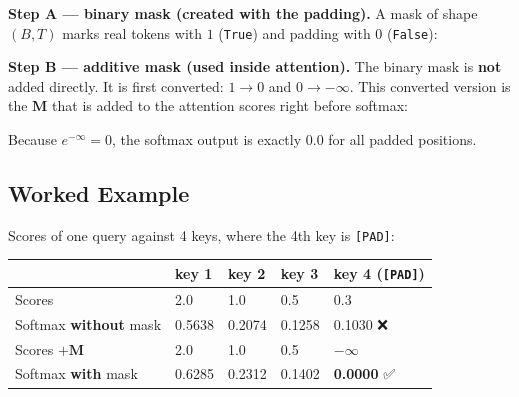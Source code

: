 \documentclass[11pt,a4paper,oneside]{report}
\begin{document}
\textbf{Step A --- binary mask (created with the padding).} A mask of shape \((B, T)\) marks real tokens with \(1\) (\texttt{True}) and padding with \(0\) (\texttt{False}):

\begin{center}\end{center}

\textbf{Step B --- additive mask (used inside attention).} The binary mask is \textbf{not} added directly. It is first converted: \(1 \rightarrow 0\) and \(0 \rightarrow -\infty\). This converted version is the \(\mathbf{M}\) that is added to the attention scores right before softmax:

\begin{center}\end{center}

Because \(e^{-\infty} = 0\), the softmax output is exactly \(0.0\) for all padded positions.

\subsection{Worked Example}\label{worked-example}

Scores of one query against 4 keys, where the 4th key is \texttt{{[}PAD{]}}:

{\def\LTcaptype{none} %
\begin{longtable}[]{@{}lllll@{}}
\toprule\noalign{}
& key 1 & key 2 & key 3 & key 4 (\texttt{{[}PAD{]}}) \\
\midrule\noalign{}
\endhead
\bottomrule\noalign{}
\endlastfoot
Scores & 2.0 & 1.0 & 0.5 & 0.3 \\
Softmax \textbf{without} mask & 0.5638 & 0.2074 & 0.1258 & 0.1030 ❌ \\
Scores \(+ \mathbf{M}\) & 2.0 & 1.0 & 0.5 & \(-\infty\) \\
Softmax \textbf{with} mask & 0.6285 & 0.2312 & 0.1402 & \textbf{0.0000} ✅ \\
\end{longtable}
}
\end{document}
